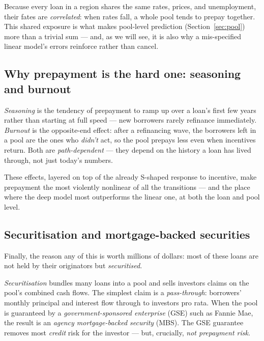 \documentclass[11pt]{article}
\begin{document}
\begin{intuition}
Because every loan in a region shares the same rates, prices, and unemployment, their fates are
\emph{correlated}: when rates fall, a whole pool tends to prepay together. This shared exposure
is what makes pool-level prediction (Section~\ref{sec:pool}) more than a trivial sum --- and, as
we will see, it is also why a mis-specified linear model's errors reinforce rather than cancel.
\end{intuition}

\subsection{Why prepayment is the hard one: seasoning and burnout}

\begin{jargon}
\emph{Seasoning} is the tendency of prepayment to ramp up over a loan's first few years rather
than starting at full speed --- new borrowers rarely refinance immediately. \emph{Burnout} is
the opposite-end effect: after a refinancing wave, the borrowers left in a pool are the ones who
\emph{didn't} act, so the pool prepays less even when incentives return. Both are
\emph{path-dependent} --- they depend on the history a loan has lived through, not just today's
numbers.
\end{jargon}

These effects, layered on top of the already S-shaped response to incentive, make prepayment the
most violently nonlinear of all the transitions --- and the place where the deep model most
outperforms the linear one, at both the loan and pool level.

\subsection{Securitisation and mortgage-backed securities}

Finally, the reason any of this is worth millions of dollars: most of these loans are not held
by their originators but \emph{securitised}.

\begin{jargon}
\emph{Securitisation} bundles many loans into a pool and sells investors claims on the pool's
combined cash flows. The simplest claim is a \emph{pass-through}: borrowers' monthly principal
and interest flow through to investors pro rata. When the pool is guaranteed by a
\emph{government-sponsored enterprise} (GSE) such as Fannie Mae, the result is an \emph{agency
mortgage-backed security} (MBS). The GSE guarantee removes most \emph{credit} risk for the
investor --- but, crucially, \emph{not prepayment risk}.
\end{jargon}
\end{document}
